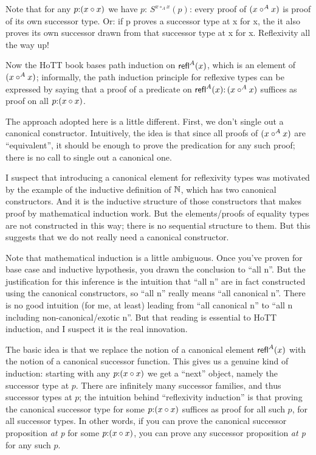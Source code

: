 \documentclass{article}
\begin{document}
Note that for any \(p{:}(x\circ x)\) we have \(p{:}\,S^{x\circ_Ax}(p)\):
every proof of \((x\circ^A x)\) is proof of its own successor type.  Or: if
p proves a successor type at x for x, the it also proves its own
successor drawn from that successor type at x for x.  Reflexivity all the way
up!


\medskip

Now the HoTT book bases path induction on \(\textsf{refl}^A(x)\), which is an
element of \((x\circ^A x)\); informally, the path induction principle for
reflexive types can be expressed by saying that a proof of a predicate
on \(\textsf{refl}^A(x){:}\,(x\circ^A x)\) suffices as proof on all \(p{:}(x\circ x)\).

\bigskip

The approach adopted here is a little different.  First, we don't
single out a canonical constructor.  Intuitively, the idea is that
since all proofs of \((x\circ^A x)\) are ``equivalent'', it should be
enough to prove the predication for any such proof; there is no call
to single out a canonical one.

\begin{remark}
I suspect that introducing a canonical element for reflexivity
types was motivated by the example of the inductive definition of
\(\mathbb{N}\), which has two canonical constructors.  And it is the
inductive structure of those constructors that makes proof by
mathematical induction work.  But the elements/proofs of equality
types are not constructed in this way; there is no sequential
structure to them.  But this suggests that we do not really need a
canonical constructor.
\end{remark}

\begin{remark}
  Note that mathematical induction is a little ambiguous.  Once you've
  proven for base case and inductive hypothesis, you drawn the
  conclusion to ``all n''.  But the justification for this inference
  is the intuition that ``all n'' are in fact constructed using the
  canonical constructors, so ``all n'' really means ``all canonical
  n''.  There is no good intuition (for me, at least) leading from
  ``all canonical n'' to ``all n including non-canonical/exotic n''.
  But that reading is essential to HoTT induction, and I suspect it is
  the real innovation.
\end{remark}

\bigskip

The basic idea is that we replace the notion of a canonical element
\(\textsf{refl}^A(x)\) with the notion of a canonical successor function.  This
gives us a genuine kind of induction: starting with any \(p{:}(x\circ x)\)
we get a ``next'' object, namely the successor type at \(p\).  There
are infinitely many successor families, and thus successor types at
\(p\); the intuition behind ``reflexivity induction'' is that proving
the canonical successor type for some \(p{:}(x\circ x)\) suffices as proof
for all such \(p\), for all successor types.  In other words, if you
can prove the canonical successor proposition \emph{at p} for some
\(p{:}(x\circ x)\), you can prove any successor proposition \emph{at p} for
any such \(p\).
\end{document}
